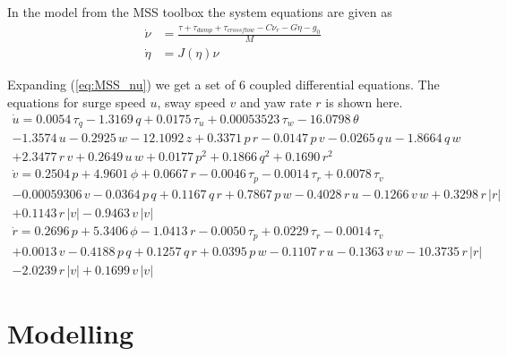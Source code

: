 \documentclass[12pt,a4]{article}
\begin{document}
In the model from the MSS toolbox the system equations are given as
\begin{align}
	\label{eq:MSS_nu}
	{\dot{\nu}}  & = \frac{\tau + \tau_{damp} + \tau_{crossflow} - C \nu_r - G \eta - g_0}{M} \\
	{\dot{\eta}} & =   J(\eta) \nu
\end{align}

Expanding (\ref{eq:MSS_nu}) we get a set of 6 coupled differential equations. The equations for surge speed $u$, sway speed $v$ and yaw rate $r$ is shown here.
\begin{multline}
	\dot{u} = 0.0054\,\tau _{q}-1.3169\,q+0.0175\,\tau _{u}+0.00053523\,\tau _{w}-16.0798\,\theta \\-1.3574\,u-0.2925\,w-12.1092\,z+0.3371\,p\,r-0.0147\,p\,v-0.0265\,q\,u-1.8664\,q\,w\\+2.3477\,r\,v+0.2649\,u\,w+0.0177\,p^2+0.1866\,q^2+0.1690\,r^2
\end{multline}
\begin{multline}
	\dot{v} = 0.2504\,p+4.9601\,\phi +0.0667\,r-0.0046\,\tau _{p}-0.0014\,\tau _{r}+0.0078\,\tau _{v}\\-0.00059306\,v-0.0364\,p\,q+0.1167\,q\,r+0.7867\,p\,w-0.4028\,r\,u-0.1266\,v\,w+0.3298\,r\,\left|r\right|\\+0.1143\,r\,\left|v\right|-0.9463\,v\,\left|v\right|
\end{multline}
\begin{multline}
	\dot{r} = 0.2696\,p+5.3406\,\phi -1.0413\,r-0.0050\,\tau _{p}+0.0229\,\tau _{r}-0.0014\,\tau _{v}\\+0.0013\,v-0.4188\,p\,q+0.1257\,q\,r+0.0395\,p\,w-0.1107\,r\,u-0.1363\,v\,w-10.3735\,r\,\left|r\right|\\-2.0239\,r\,\left|v\right|+0.1699\,v\,\left|v\right|
\end{multline}



\section{Modelling}
\end{document}
